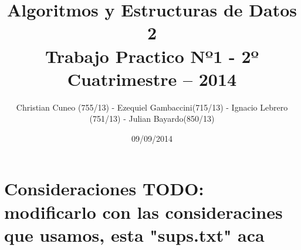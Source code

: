 ﻿\documentclass[a4paper, 10pt]{article}
\title{Algoritmos y Estructuras de Datos 2 \\ Trabajo Practico Nº1 - 2º Cuatrimestre – 2014}
\author{Christian Cuneo (755/13) - Ezequiel Gambaccini(715/13) - Ignacio Lebrero (751/13) - Julian Bayardo(850/13)}
\date{09/09/2014}
\begin{document}
    \maketitle
    \section*{Consideraciones TODO: modificarlo con las consideracines que usamos, esta "sups.txt" aca}
        
    \clearpage
        
    \clearpage
\end{document}
